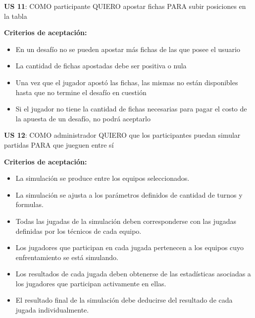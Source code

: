 \begin{tcolorbox}
\textbf{US 11}: COMO participante QUIERO apostar fichas PARA subir posiciones en la tabla

\vline

\textbf{Criterios de aceptación:}
\begin{itemize}
\item En un desafío no se pueden apostar más fichas de las que posee el usuario
\item La cantidad de fichas apostadas debe ser positiva o nula
\item Una vez que el jugador apostó las fichas, las mismas no están disponibles hasta que no termine el desafío en cuestión
\item Si el jugador no tiene la cantidad de fichas necesarias para pagar el costo de la apuesta de un desafío, no podrá aceptarlo
\end{itemize}
\end{tcolorbox}
\vspace{10pt}


\begin{tcolorbox}
\textbf{US 12}: COMO administrador QUIERO que los participantes puedan simular partidas PARA que jueguen entre sí

\vline

\textbf{Criterios de aceptación:}
\begin{itemize}
\item La simulación se produce entre los equipos seleccionados.
\item La simulación se ajusta a los parámetros definidos de cantidad de turnos y formulas.
\item Todas las jugadas de la simulación deben corresponderse con las jugadas definidas por los técnicos de cada equipo.
\item Los jugadores que participan en cada jugada pertenecen a los equipos cuyo enfrentamiento se está simulando.
\item Los resultados de cada jugada deben obtenerse de las estadísticas asociadas a los jugadores que participan activamente en ellas.
\item El resultado final de la simulación debe deducirse del resultado de cada jugada individualmente.
\end{itemize}
\end{tcolorbox}
\vspace{10pt}


